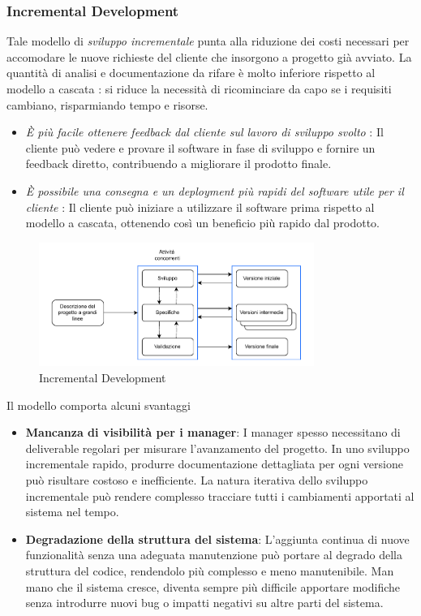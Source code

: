 \documentclass[10pt, letterpaper]{report}
\begin{document}
\subsubsection{Incremental Development}
Tale modello di \textit{sviluppo incrementale} punta alla riduzione dei costi necessari per 
accomodare le nuove richieste del cliente che insorgono a progetto già avviato. La quantità di analisi e documentazione da rifare è molto inferiore rispetto al modello a cascata : si riduce la necessità di ricominciare da capo se i requisiti cambiano, risparmiando tempo e risorse. 
\begin{itemize}
    \item \textit{È più facile ottenere feedback dal cliente sul lavoro di sviluppo svolto} : Il cliente può vedere e provare il software in fase di sviluppo e fornire un feedback diretto, contribuendo a migliorare il prodotto finale. 
    \item \textit{È possibile una consegna e un deployment più rapidi del software utile per il cliente} : Il cliente può iniziare a utilizzare il software prima rispetto al modello a cascata, ottenendo così un beneficio più rapido dal prodotto.
\end{itemize}\begin{center}
\begin{figure}[h!]
    \centering 
    \includegraphics[width=0.8\textwidth ]{images/IncrementalDevelopment.pdf}
    \caption{Incremental Development}
\end{figure}\end{center}
Il modello comporta alcuni svantaggi\begin{itemize}
    \item \textbf{Mancanza di visibilità per i manager}: I manager spesso necessitano di deliverable regolari per misurare l'avanzamento del progetto. In uno sviluppo incrementale rapido, produrre documentazione dettagliata per ogni versione può risultare costoso e inefficiente. La natura iterativa dello sviluppo incrementale può rendere complesso tracciare tutti i cambiamenti apportati al sistema nel tempo.
    \item \textbf{Degradazione della struttura del sistema}: L'aggiunta continua di nuove funzionalità senza una adeguata manutenzione può portare al degrado della struttura del codice, rendendolo più complesso e meno manutenibile. Man mano che il sistema cresce, diventa sempre più difficile apportare modifiche senza introdurre nuovi bug o impatti negativi su altre parti del sistema.
\end{itemize}
\end{document}
